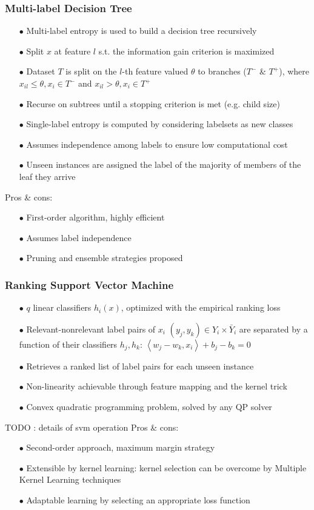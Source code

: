 \documentclass{beamer}
\begin{document}
\begin{frame}
\frametitle{Multi-label Decision Tree}
\begin{itemize}
\item[$\bullet$] Multi-label entropy is used to build a decision tree recursively
\item[$\bullet$] Split $x$ at feature $l$ s.t. the information gain criterion is maximized
\item[$\bullet$] Dataset $T$ is split on the $l$-th feature valued $\theta$ to branches ($T^-$ \& $T^+$), where $ x_{il} \leq \theta, x_i \in T^-$ and $ x_{il} > \theta, x_i \in T^+$
\item[$\bullet$] Recurse on subtrees until a stopping criterion is met (e.g. child size)
\item[$\bullet$] Single-label entropy is computed by considering labelsets as new classes
\item[$\bullet$] Assumes independence among labels to ensure low computational cost
\item[$\bullet$] Unseen instances are assigned the label of the majority of members of the leaf they arrive
\end{itemize}
Pros \& cons:
\begin{itemize}
\item[$\bullet$] First-order algorithm, highly efficient
\item[$\bullet$] Assumes label independence
\item[$\bullet$] Pruning and ensemble strategies proposed
\end{itemize}
\end{frame}
\begin{frame}
\frametitle{Ranking Support Vector Machine}
\begin{itemize}
	\item[$\bullet$] $q$ linear classifiers $h_i(x)$, optimized with the empirical ranking loss
\item[$\bullet$] Relevant-nonrelevant label pairs of $x_i$ $(y_j,y_k) \in Y_i \times \bar Y_i$ are separated by a function of their classifiers $h_j, h_k$: $\left<w_j-w_k, x_i \right> + b_j - b_k=0$
\item[$\bullet$] Retrieves a ranked list of label pairs for each unseen instance
\item[$\bullet$] Non-linearity achievable through feature mapping and the kernel trick
\item[$\bullet$] Convex quadratic programming problem, solved by any QP solver
\end{itemize}
TODO : details of svm operation
Pros \& cons:
\begin{itemize}
\item[$\bullet$] Second-order approach, maximum margin strategy
\item[$\bullet$] Extensible by kernel learning: kernel selection can be overcome by Multiple Kernel Learning techniques
\item[$\bullet$] Adaptable learning by selecting an appropriate loss function
\end{itemize}

\end{frame}
\end{document}
